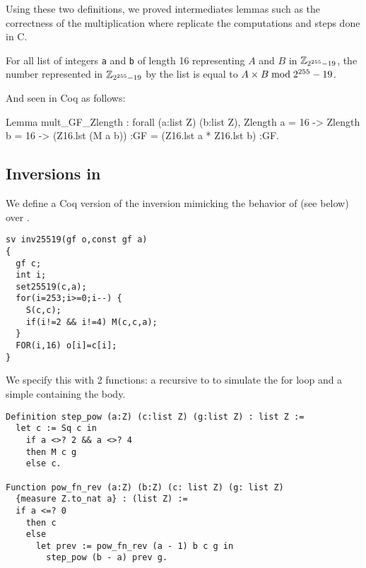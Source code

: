 Using these two definitions, we proved intermediates lemmas such as the correctness of the
multiplication  where  replicate the computations and steps done in C.
\begin{lemma}
For all list of integers \texttt{a} and \texttt{b} of length 16 representing
$A$ and $B$ in $\mathbb{Z}_{2^{255}-19}$, the number represented in $\mathbb{Z}_{2^{255}-19}$ by the list 
is equal to $A \times B \bmod 2^{255}-19$.
\end{lemma}
And seen in Coq as follows:
\begin{Coq}
Lemma mult_GF_Zlength :
  forall (a:list Z) (b:list Z),
  Zlength a = 16 ->
  Zlength b = 16 ->
   (Z16.lst (M a b)) :GF =
   (Z16.lst a * Z16.lst b) :GF.
\end{Coq}

\subsection{Inversions in \Zfield}

We define a Coq version of the inversion mimicking
the behavior of  (see below) over .
\begin{lstlisting}[language=Ctweetnacl]
sv inv25519(gf o,const gf a)
{
  gf c;
  int i;
  set25519(c,a);
  for(i=253;i>=0;i--) {
    S(c,c);
    if(i!=2 && i!=4) M(c,c,a);
  }
  FOR(i,16) o[i]=c[i];
}
\end{lstlisting}
We specify this with 2 functions: a recursive  to to simulate the for loop and a simple
 containing the body.
\begin{lstlisting}[language=Coq]
Definition step_pow (a:Z) (c:list Z) (g:list Z) : list Z :=
  let c := Sq c in
    if a <>? 2 && a <>? 4
    then M c g
    else c.

Function pow_fn_rev (a:Z) (b:Z) (c: list Z) (g: list Z)
  {measure Z.to_nat a} : (list Z) :=
  if a <=? 0
    then c
    else
      let prev := pow_fn_rev (a - 1) b c g in
        step_pow (b - a) prev g.
\end{lstlisting}

